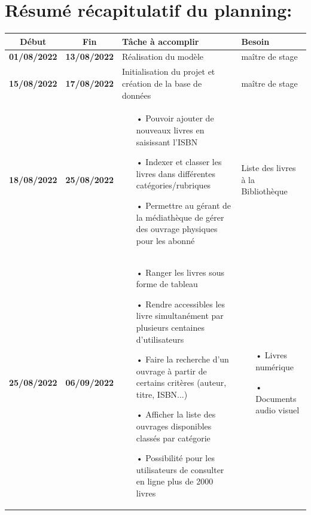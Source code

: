 \documentclass[12pt,a4paper]{article}
\begin{document}
\section{Résumé récapitulatif du planning:}
\begin{center}
\begin{tabular}{|c|c|p{6cm}|p{4cm}|}
\hline 
Début & Fin & Tâche à accomplir & Besoin \\ 
\hline 
\textbf{01/08/2022} & \textbf{13/08/2022} & Réalisation du modèle & maître de stage\\ 
\hline 
\textbf{15/08/2022} & \textbf{17/08/2022} & Initialisation du projet et création de la base de données & maître de stage \\ 
\hline
\textbf{18/08/2022} & \textbf{25/08/2022} & \begin{itemize}
\item[•] Pouvoir ajouter de nouveaux livres en saisissant l’ISBN
\item[•] Indexer et classer les livres dans différentes catégories/rubriques
\item[•] Permettre au gérant de la médiathèque de gérer des ouvrage physiques pour les abonné
\end{itemize} & Liste des livres à la Bibliothèque \\ 
\hline 
\textbf{25/08/2022} & \textbf{06/09/2022} & \begin{itemize}
\item[•] Ranger les livres sous forme de tableau
\item[•] Rendre accessibles les livre simultanément par plusieurs centaines d’utilisateurs
\item[•] Faire la recherche d’un ouvrage à partir de certains critères (auteur, titre, ISBN...)
\item[•] Afficher la liste des ouvrages disponibles classés par catégorie
\item[•] Possibilité pour les utilisateurs de consulter en ligne plus de 2000 livres
\end{itemize} & 
\begin{itemize}
\item[•] Livres numérique
\item[•] Documents audio visuel
\end{itemize} \\
\hline 
\end{tabular} 
\end{center}

\newpage
\end{document}
